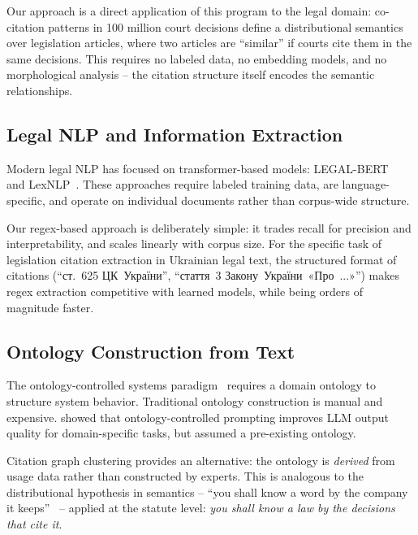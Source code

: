 \documentclass[11pt]{article}
\begin{document}
Our approach is a direct application of this program to the legal domain: co-citation patterns in 100 million court decisions define a distributional semantics over legislation articles, where two articles are ``similar'' if courts cite them in the same decisions.
This requires no labeled data, no embedding models, and no morphological analysis -- the citation structure itself encodes the semantic relationships.

\subsection{Legal NLP and Information Extraction}

Modern legal NLP has focused on transformer-based models: LEGAL-BERT~\citep{chalkidis2020legal} and LexNLP~\citep{bommarito2018lexnlp}.
These approaches require labeled training data, are language-specific, and operate on individual documents rather than corpus-wide structure.

Our regex-based approach is deliberately simple: it trades recall for precision and interpretability, and scales linearly with corpus size.
For the specific task of legislation citation extraction in Ukrainian legal text, the structured format of citations (``\foreignlanguage{ukrainian}{ст.~625 ЦК~\foreignlanguage{ukrainian}{України}}'', ``\foreignlanguage{ukrainian}{стаття~3 Закону~\foreignlanguage{ukrainian}{України}~«Про~...»}'') makes regex extraction competitive with learned models, while being orders of magnitude faster.

\subsection{Ontology Construction from Text}

The ontology-controlled systems paradigm~\citep{palagin2006architecture} requires a domain ontology to structure system behavior.
Traditional ontology construction is manual and expensive.
\citet{palagin2023ontochatgpt} showed that ontology-controlled prompting improves LLM output quality for domain-specific tasks, but assumed a pre-existing ontology.

Citation graph clustering provides an alternative: the ontology is \emph{derived} from usage data rather than constructed by experts.
This is analogous to the distributional hypothesis in semantics -- ``you shall know a word by the company it keeps''~\citep{palagin2020distributional} -- applied at the statute level: \emph{you shall know a law by the decisions that cite it}.
\end{document}
